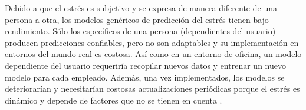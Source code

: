 






Debido a que el estrés es subjetivo y se expresa de manera diferente de una
persona a otra, los modelos genéricos de predicción del estrés tienen bajo rendimiento. Sólo los específicos
de una persona (dependientes del usuario) producen predicciones confiables, pero no son adaptables y su
implementación en entornos del mundo real es costosa.
Así como  en un entorno de oficina, un modelo  dependiente del usuario requeriría recopilar nuevos datos y entrenar un nuevo modelo para cada empleado. Además, una vez implementados, los modelos se deteriorarían y necesitarían
costosas actualizaciones periódicas porque el estrés es dinámico y depende de factores que no se tienen en cuenta .




















